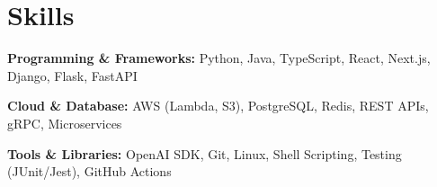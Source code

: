 \section{Skills}

\begin{onecolentry}
    \textbf{Programming \& Frameworks:} Python, Java, TypeScript, React, Next.js, Django, Flask, FastAPI
\end{onecolentry}

\vspace{0.2cm}

\begin{onecolentry}
    \textbf{Cloud \& Database:} AWS (Lambda, S3), PostgreSQL, Redis, REST APIs, gRPC, Microservices
\end{onecolentry}

\vspace{0.2cm}

\begin{onecolentry}
    \textbf{Tools \& Libraries:} OpenAI SDK, Git, Linux, Shell Scripting, Testing (JUnit/Jest), GitHub Actions
\end{onecolentry}
